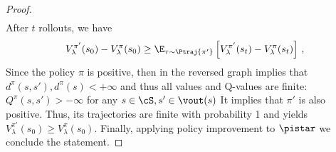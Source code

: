 \begin{proof}
\begin{align*}
    \end{align*}
    After $t$ rollouts, we have
    \[
        V^{\pi'}_{\lambda}(s_0) - V^{\pi}_{\lambda}(s_0) \geq \E_{\tau \sim \Ptraj{\pi'}} \left[ V^{\pi'}_{\lambda}(s_t) - V^{\pi}_{\lambda}(s_t)  \right]\,,
    \]
    Since the policy $\pi$ is positive, then  in the reversed graph implies that $d^{\pi}(s,s'), d^{\pi}(s) < +\infty$ and thus all values and Q-values are finite: $Q^{\pi}(s,s') > -\infty$ for any $s \in \cS, s' \in \vout(s)$ It implies that $\pi'$ is also positive. Thus, its trajectories are finite with probability 1 and yields $V^{\pi'}_{\lambda}(s_0) \geq V^{\pi}_{\lambda}(s_0)$. Finally, applying policy improvement to $\pistar$ we conclude the statement.
\end{proof}



